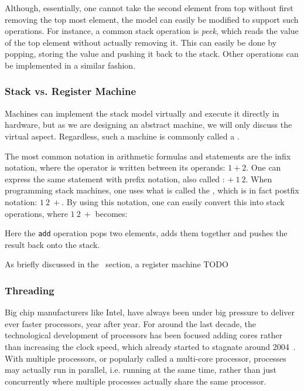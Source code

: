 
Although, essentially, one cannot take the second element from top without first
removing the top most element, the model can easily be modified to support such
operations. For instance, a common stack operation is {\it peek}, which reads
the value of the top element without actually removing it. This can easily be
done by popping, storing the value and pushing it back to the stack. Other
operations can be implemented in a similar fashion.

\subsubsection{Stack vs. Register Machine}
Machines can implement the stack model virtually and execute it directly in
hardware, but as we are designing an abstract machine, we will only discuss the
virtual aspect. Regardless, such a machine is commonly called a .

The most common notation in arithmetic formulas and statements are the infix
notation, where the operator is written between its operands: $1 + 2$. One can
express the same statement with prefix notation, also called : $+\ 1\ 2$. When programming stack machines, one uses what is called
the , which is in fact postfix notation:
$1\ 2\ +$. By using this notation, one can easily convert this into stack
operations, where $1\ 2\ +$ becomes:
\begin{stackops}
\end{stackops}

Here the {\tt add} operation pops two elements, adds them together and pushes
the result back onto the stack.

As briefly discussed in the~ section, a register machine
TODO

\subsubsection{Threading}
Big chip manufacturers like Intel, have always been under big pressure to
deliver ever faster processors, year after year. For around the last decade, the
technological development of processors has been focused adding cores rather
than increasing the clock speed, which already started to stagnate around
2004~\cite{sutter}. With multiple processors, or popularly called a multi-core
processor, processes may actually run in parallel, i.e. running at the same
time, rather than just concurrently where multiple processes actually share the
same processor.

